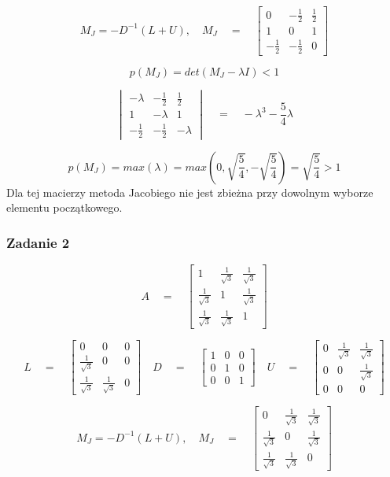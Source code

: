 \documentclass[a4paper]{article}
\begin{document}
$$M_J = -D^{-1}(L+U),\quad M_J\quad = \quad 
\begin{bmatrix}
0 & -\frac{1}{2} & \frac{1}{2} \\
 1 & 0 &  1 \\
 -\frac{1}{2} &  -\frac{1}{2} & 0
\end{bmatrix}
$$

$$ p(M_J) = det(M_J - \lambda I)<1$$

$$
\begin{vmatrix}
-\lambda & -\frac{1}{2} &  \frac{1}{2} \\
1 & -\lambda &  1 \\
-\frac{1}{2} &  -\frac{1}{2} & -\lambda
\end{vmatrix}
\quad = \quad -\lambda^3 - \frac{5}{4}\lambda
$$

$$ p(M_J) = max(\lambda) = max(0, \sqrt{\frac{5}{4}},-\sqrt{\frac{5}{4}}) =  \sqrt{\frac{5}{4}} > 1 $$
Dla tej macierzy metoda Jacobiego nie jest zbieżna przy dowolnym wyborze elementu początkowego.
\subsubsection{Zadanie 2}
$$A \quad = \quad 
\begin{bmatrix}
1 & \frac{1}{\sqrt{3}} &  \frac{1}{\sqrt{3}} \\
 \frac{1}{\sqrt{3}} & 1 &  \frac{1}{\sqrt{3}} \\
 \frac{1}{\sqrt{3}} &  \frac{1}{\sqrt{3}} & 1
\end{bmatrix}
$$

$$L \quad = \quad 
\begin{bmatrix}
0 & 0 &  0 \\
 \frac{1}{\sqrt{3}} & 0 &  0 \\
 \frac{1}{\sqrt{3}} &  \frac{1}{\sqrt{3}} & 0
\end{bmatrix}
\quad
D \quad = \quad 
\begin{bmatrix}
1 & 0 &  0 \\
 0 & 1 &  0 \\
 0 &  0 & 1
\end{bmatrix}
\quad
U \quad = \quad 
\begin{bmatrix}
0 & \frac{1}{\sqrt{3}} &  \frac{1}{\sqrt{3}} \\
0 & 0 &  \frac{1}{\sqrt{3}} \\
 0 &  0 & 0
\end{bmatrix}
$$

$$M_J = -D^{-1}(L+U),\quad M_J\quad = \quad 
\begin{bmatrix}
0 & \frac{1}{\sqrt{3}} &  \frac{1}{\sqrt{3}} \\
 \frac{1}{\sqrt{3}} & 0 &  \frac{1}{\sqrt{3}} \\
 \frac{1}{\sqrt{3}} &  \frac{1}{\sqrt{3}} & 0
\end{bmatrix}
$$
\end{document}
